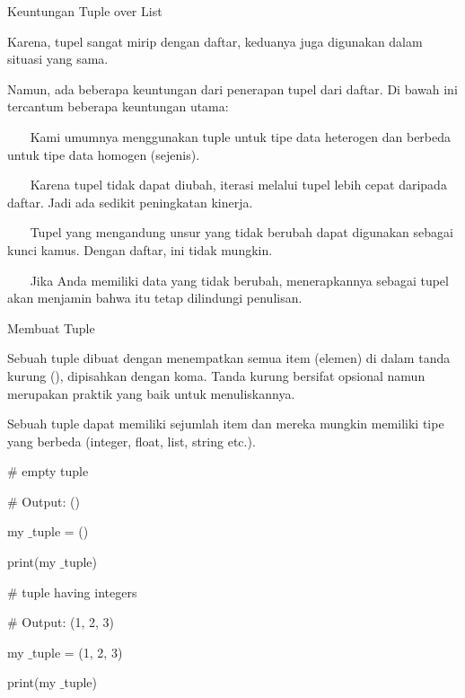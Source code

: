Keuntungan Tuple over List \par
\vspace{12pt}
Karena, tupel sangat mirip dengan daftar, keduanya juga digunakan dalam situasi yang sama. \par
\vspace{12pt}
Namun, ada beberapa keuntungan dari penerapan tupel dari daftar. Di bawah ini tercantum beberapa keuntungan utama: \par
\vspace{12pt}
~~~ Kami umumnya menggunakan tuple untuk tipe data heterogen dan berbeda untuk tipe data homogen (sejenis). \par
~~~ Karena tupel tidak dapat diubah, iterasi melalui tupel lebih cepat daripada daftar. Jadi ada sedikit peningkatan kinerja. \par
~~~ Tupel yang mengandung unsur yang tidak berubah dapat digunakan sebagai kunci kamus. Dengan daftar, ini tidak mungkin. \par
~~~ Jika Anda memiliki data yang tidak berubah, menerapkannya sebagai tupel akan menjamin bahwa itu tetap dilindungi penulisan. \par
\vspace{12pt}
Membuat Tuple \par
\vspace{12pt}
Sebuah tuple dibuat dengan menempatkan semua item (elemen) di dalam tanda kurung (), dipisahkan dengan koma. Tanda kurung bersifat opsional namun merupakan praktik yang baik untuk menuliskannya. \par
\vspace{12pt}
Sebuah tuple dapat memiliki sejumlah item dan mereka mungkin memiliki tipe yang berbeda (integer, float, list, string etc.). \par
\vspace{12pt}
\vspace{12pt}
 $  \#  $ empty tuple \par
 $  \#  $ Output: () \par
my $  \_  $tuple = () \par
print(my $  \_  $tuple) \par
\vspace{12pt}
 $  \#  $ tuple having integers \par
 $  \#  $ Output: (1, 2, 3) \par
my $  \_  $tuple = (1, 2, 3) \par
print(my $  \_  $tuple) \par
\vspace{12pt}
